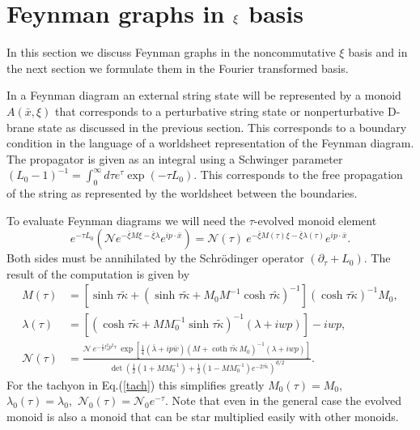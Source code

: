 \documentclass[a4paper,11pt]{article}
\begin{document}
\section{Feynman graphs in $\protect\xi $ basis}

In this section we discuss Feynman graphs in the noncommutative $\xi $ basis
and in the next section we formulate them in the Fourier transformed basis.

In a Feynman diagram an external string state will be represented by a
monoid $A\left( \bar{x},\xi \right) $ that corresponds to a perturbative
string state or nonperturbative D-brane state as discussed in the previous
section. This corresponds to a boundary condition in the language of a
worldsheet representation of the Feynman diagram. The propagator is given as
an integral using a Schwinger parameter $\left( L_{0}-1\right)
^{-1}=\int_{0}^{\infty }d\tau e^{\tau }\exp \left( -\tau L_{0}\right) .$
This corresponds to the free propagation of the string as represented by the
worldsheet between the boundaries.

To evaluate Feynman diagrams we will need the $\tau $-evolved monoid element
\begin{equation}
e^{-\tau L_{0}}\left( \mathcal{N}e^{-\bar{\xi}M\xi -\bar{\xi}\lambda
}e^{ip\cdot \bar{x}}\right) =\mathcal{N}\!\left( \tau \right) ~e^{-\bar{\xi}%
M\left( \tau \right) \xi -\bar{\xi}\lambda \left( \tau \right) }e^{ip\cdot
\bar{x}}.  \label{evolution}
\end{equation}%
Both sides must be annihilated by the Schr\"{o}dinger operator $\left(
\partial _{\tau }+L_{0}\right) .$ The result of the computation is given by%
\begin{align}
M\!\left( \tau \right) & =\left[ \sinh\tau \tilde{\kappa} +\left( \sinh\tau
\tilde{\kappa} +M_{0}M^{-1}\cosh \tau \tilde{\kappa}\right) ^{-1}\right]
\left( \cosh \tau \tilde{\kappa}\right) ^{-1}M_{0} ,  \label{tM} \\
\lambda\!\left( \tau \right) & =\left[ \left( \cosh \tau \tilde{\kappa}%
+MM_{0}^{-1}\sinh \tau \tilde{\kappa}\right) ^{-1}\left( \lambda +iwp\right) %
\right] -iwp ,  \label{tlam} \\
\mathcal{N}\!\left( \tau \right) & =\frac{\mathcal{N}~e^{-\frac{1}{2}%
l_{s}^{2}p^{2}\tau }~\exp \left[ \frac{1}{4}\left( \bar{\lambda}+ip\bar{w}%
\right) \left( M+\coth \tau \tilde{\kappa}~M_{0}\right) ^{-1}\left( \lambda
+iwp\right) \right] }{\det \left( \frac{1}{2}\left( 1+MM_{0}^{-1}\right)
+\frac{1}{2}\left( 1-MM_{0}^{-1}\right)e^{-2\tau \tilde{\kappa}} \right)
^{d/2}} .  \label{tN}
\end{align}%
For the tachyon in Eq.(\ref{tach}) this simplifies greatly $M_{0}\left( \tau
\right) =M_{0},$ $\lambda _{0}\left( \tau \right) =\lambda _{0},$ $\mathcal{N%
}_{0}\left( \tau \right) =\mathcal{N}_{0}e^{-\tau }.$ Note that even in the
general case the evolved monoid is also a monoid that can be star multiplied
easily with other monoids.
\end{document}
